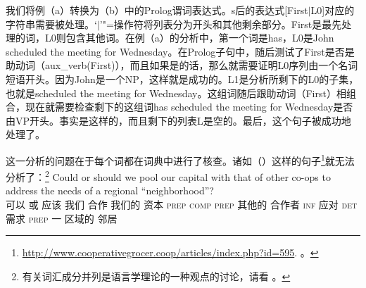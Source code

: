 \zl
%
我们将例（a）转换为（b）中的Prolog谓词表达式。s后的表达式[First$|$L0]对应的字符串需要被处理。`$|$'"=操作符将列表分为开头和其他剩余部分。First是最先处理的词，L0则包含其他词。在例（a）的分析中，第一个词是has，L0是John scheduled the meeting for
Wednesday。在Prolog子句中，随后测试了First是否是助动词（aux\_verb(First)），而且如果是的话，那么就需要证明L0序列由一个名词短语开头。因为John是一个NP，这样就是成功的。L1是分析所剩下的L0的子集，也就是scheduled the meeting for Wednesday。这组词随后跟助动词（First）相组合，现在就需要检查剩下的这组词has scheduled the meeting for Wednesday是否由VP开头。事实是这样的，而且剩下的列表L是空的。最后，这个句子被成功地处理了。

这一分析的问题在于每个词都在词典中进行了核查。诸如（）这样的句子\footnote{%
  \url{http://www.cooperativegrocer.coop/articles/index.php?id=595}. 。
}就无法分析了：\footnote{%
  有关词汇成分并列是语言学理论的一种观点的讨论，请看 。
} 
\ea
\gll Could or should we pool our capital with that of other co-ops to address the needs of a regional
``neighborhood''?\\
可以 或 应该 我们 合作 我们的 资本 \textsc{prep} \textsc{comp} \textsc{prep} 其他的 合作者 \textsc{inf} 应对 \textsc{det} 需求 \textsc{prep} 一 区域的 邻居\\

